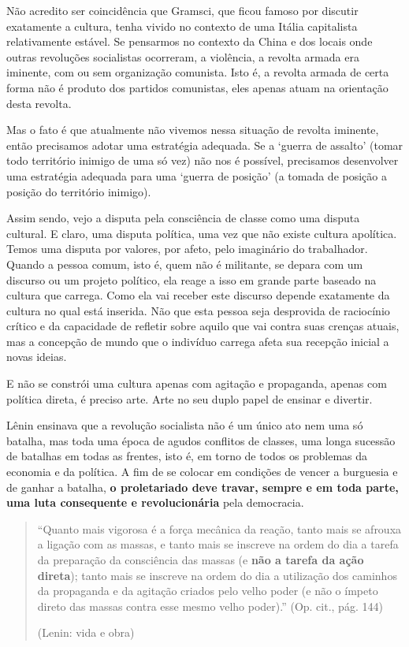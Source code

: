 Não acredito ser coincidência que Gramsci, que ficou famoso por discutir exatamente a cultura, tenha vivido no contexto de uma Itália capitalista relativamente estável. Se pensarmos no contexto da China e dos locais onde outras revoluções socialistas ocorreram, a violência, a revolta armada era iminente, com ou sem organização comunista. Isto é, a revolta armada de certa forma não é produto dos partidos comunistas, eles apenas atuam na orientação desta revolta.

Mas o fato é que atualmente não vivemos nessa situação de revolta iminente, então precisamos adotar uma estratégia adequada. Se a ‘guerra de assalto’ (tomar todo território inimigo de uma só vez) não nos é possível, precisamos desenvolver uma estratégia adequada para uma ‘guerra de posição’ (a tomada de posição a posição do território inimigo).

Assim sendo, vejo a disputa pela consciência de classe como uma disputa cultural. E claro, uma disputa política, uma vez que não existe cultura apolítica. Temos uma disputa por valores, por afeto, pelo imaginário do trabalhador. Quando a pessoa comum, isto é, quem não é militante, se depara com um discurso ou um projeto político, ela reage a isso em grande parte baseado na cultura que carrega. Como ela vai receber este discurso depende exatamente da cultura no qual está inserida. Não que esta pessoa seja desprovida de raciocínio crítico e da capacidade de refletir sobre aquilo que vai contra suas crenças atuais, mas a concepção de mundo que o indivíduo carrega afeta sua recepção inicial a novas ideias.

E não se constrói uma cultura apenas com agitação e propaganda, apenas com política direta, é preciso arte. Arte no seu duplo papel de ensinar e divertir.

Lênin ensinava que a revolução socialista não é um único ato nem uma só batalha, mas toda uma época de agudos conflitos de classes, uma longa sucessão de batalhas em todas as frentes, isto é, em torno de todos os problemas da economia e da política. A fim de se colocar em condições de vencer a burguesia e de ganhar a batalha, \textbf{o proletariado deve travar, sempre e em toda parte, uma luta consequente e revolucionária} pela democracia.

\begin{quote}
“Quanto mais vigorosa é a força mecânica da reação, tanto mais se afrouxa a ligação com as massas, e tanto mais se inscreve na ordem do dia a tarefa da preparação da consciência das massas (e \textbf{não a tarefa da ação direta}); tanto mais se inscreve na ordem do dia a utilização dos caminhos da propaganda e da agitação criados pelo velho poder (e não o ímpeto direto das massas contra esse mesmo velho poder).” (Op. cit., pág. 144)

(Lenin: vida e obra)
\end{quote}

